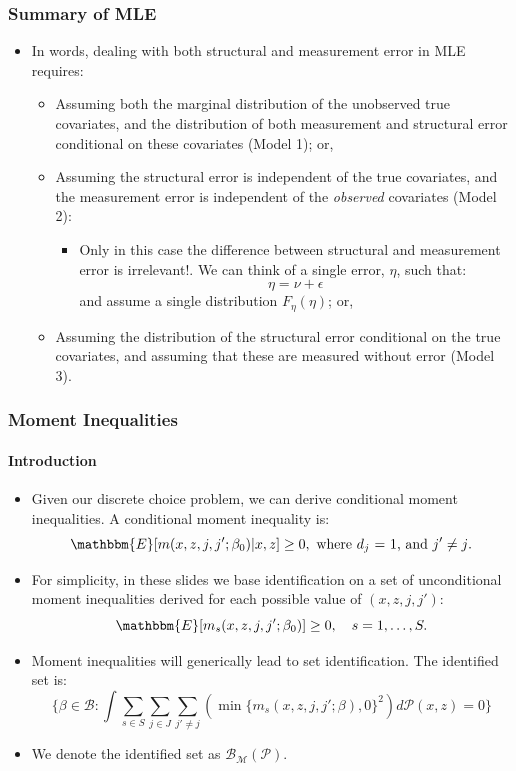 \documentclass[10pt,letterpaper]{beamer}
\begin{document}
\begin{frame}
\frametitle{Summary of MLE}

\begin{itemize}
	\item In words, dealing with both structural and measurement error  in MLE requires:
	\begin{itemize}
		\item Assuming both the marginal distribution of the unobserved true covariates, and the distribution of both measurement and structural error conditional on these covariates (Model 1); or,
		\item Assuming the structural error is independent of the true covariates, and the measurement error is independent of the \textit{observed} covariates (Model 2):
		\begin{itemize}
			\item Only in this case the difference between structural and measurement error is irrelevant!. We can think of a single error, $\eta$, such that:
			\begin{equation*}
			\eta = \nu + \epsilon
			\end{equation*}
			and assume a single distribution $F_{\eta}(\eta)$; or,
		\end{itemize}
		\item Assuming the distribution of the structural error conditional on the true covariates, and assuming that these are measured without error (Model 3).
	\end{itemize}
\end{itemize}
\end{frame}
\begin{frame}
\frametitle{Moment Inequalities}
\framesubtitle{Introduction}

\begin{itemize}
	\item Given our discrete choice problem, we can derive conditional moment inequalities. A conditional moment inequality is:
	\begin{equation*}
	\mathbbm{E}[m(x,z,j,j';\beta_{0})|x,z]\geq 0,\text{ where $d_{j}$ $=$ $1$, and $j'\neq j$}.
	\end{equation*}
	\item For simplicity, in these slides we base identification on a set of unconditional moment inequalities derived for each possible value of $(x,z,j,j')$:
	\begin{equation*}
	\mathbbm{E}[m_{s}(x,z,j,j';\beta_{0})]\geq 0,\quad s=1,\dots,S.
	\end{equation*}
	\item Moment inequalities will generically lead to set identification. The identified set is:
	\begin{equation*}
	\{\beta\in\mathcal{B}:\int\sum_{s\in S}\sum_{j\in J}\sum_{j'\neq j}(\min\{m_{s}(x,z,j,j';\beta),0\}^{2})d\mathcal{P}(x,z)=0\}
	\end{equation*}
	\item We denote the identified set as $\mathcal{B}_{\mathcal{M}}(\mathcal{P})$.
\end{itemize}
\end{frame}
\end{document}
